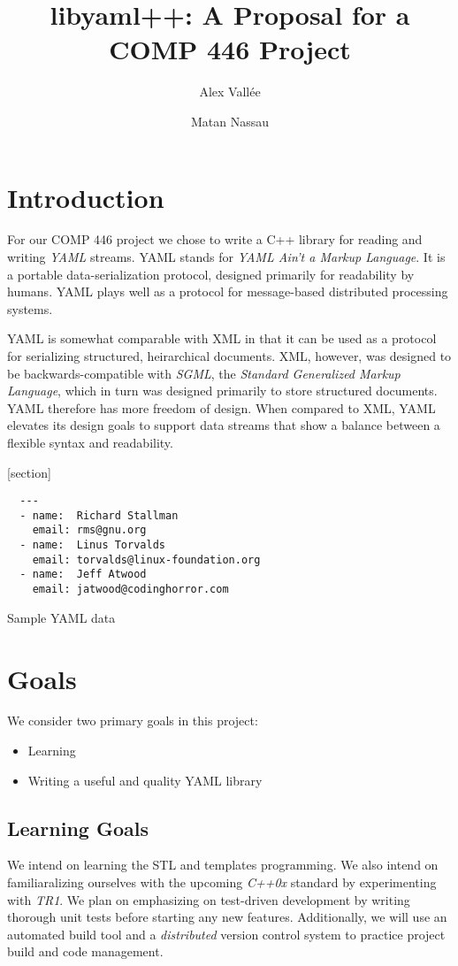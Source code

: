 \documentclass{article}
\author{Alex Vall\'ee \and Matan Nassau}
\title{libyaml++:  A Proposal for a COMP 446 Project}
\begin{document}
\maketitle

\section{Introduction}
For our COMP 446 project we chose to write a C++ library for reading and writing \emph{YAML} streams.  YAML stands for \emph{YAML Ain't a Markup Language}.  It is a portable data-serialization protocol, designed primarily for readability by humans.  YAML plays well as a protocol for message-based distributed processing systems.

YAML is somewhat comparable with XML in that it can be used as a protocol for serializing structured, heirarchical documents.  XML, however, was designed to be backwards-compatible with \emph{SGML}, the \emph{Standard Generalized Markup Language}, which in turn was designed primarily to store structured documents.  YAML therefore has more freedom of design.  When compared to XML, YAML elevates its design goals to support data streams that show a balance between a flexible syntax and readability.

[section]
\begin{Figure}
  \begin{verbatim}
  ---
  - name:  Richard Stallman
    email: rms@gnu.org
  - name:  Linus Torvalds
    email: torvalds@linux-foundation.org
  - name:  Jeff Atwood
    email: jatwood@codinghorror.com
  \end{verbatim}
  \caption{Sample YAML data}
\end{Figure}

\section{Goals}

We consider two primary goals in this project:

\begin{itemize}
  \item Learning
  \item Writing a useful and quality YAML library
\end{itemize}

\subsection{Learning Goals}
We intend on learning the STL and templates programming. We also intend on familiaralizing ourselves with the upcoming \emph{C++0x} standard by experimenting with \emph{TR1}.  We plan on emphasizing on test-driven development by writing thorough unit tests before starting any new features.  Additionally, we will use an automated build tool and a \emph{distributed} version control system to practice project build and code management.
\end{document}
